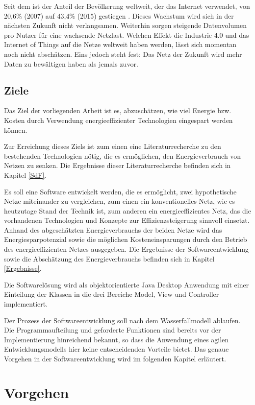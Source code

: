 \documentclass[12pt,titlepage]{article}
\begin{document}
Seit dem ist der Anteil der Bevölkerung weltweit, der das Internet verwendet, von 20,6\% (2007) auf 43,4\% (2015) gestiegen \cite{itu}. Dieses Wachstum wird sich in der nächsten Zukunft nicht verlangsamen. Weiterhin sorgen steigende Datenvolumen pro Nutzer für eine wachsende Netzlast. Welchen Effekt die Industrie 4.0 und das Internet of Things auf die Netze weltweit haben werden, lässt sich momentan  noch nicht abschätzen. Eins jedoch steht fest: Das Netz der Zukunft wird mehr Daten zu bewältigen haben als jemals zuvor.

\subsection{Ziele}
Das Ziel der vorliegenden Arbeit ist es, abzuschätzen, wie viel Energie bzw. Kosten  durch Verwendung energieeffizienter Technologien eingespart werden können.

Zur Erreichung dieses Ziels ist zum einen eine Literaturrecherche zu den bestehenden Technologien nötig, die es ermöglichen, den Energieverbrauch von Netzen zu senken. Die Ergebnisse dieser Literaturrecherche befinden sich in Kapitel \ref{SdF}.

Es soll eine Software entwickelt werden, die es ermöglicht, zwei hypothetische Netze miteinander zu vergleichen, zum einen ein konventionelles Netz, wie es heutzutage Stand der Technik ist, zum anderen ein energieeffizientes Netz, das die vorhandenen Technologien und Konzepte zur Effizienzsteigerung sinnvoll einsetzt. Anhand des abgeschätzten Energieverbrauchs der beiden Netze wird das Energiesparpotenzial sowie die möglichen Kosteneinsparungen durch den Betrieb des energieeffizienten Netzes ausgegeben. Die Ergebnisse der Softwareentwicklung sowie die Abschätzung des Energieverbrauchs befinden sich in Kapitel \ref{Ergebnisse}.

Die Softwarelösung wird als objektorientierte Java Desktop Anwendung mit einer Einteilung der Klassen in die drei Bereiche Model, View und Controller implementiert.

Der Prozess der Softwareentwicklung soll nach dem Wasserfallmodell ablaufen. Die Programmaufteilung und geforderte Funktionen sind bereits vor der Implementierung hinreichend bekannt, so dass die Anwendung eines agilen Entwicklungsmodells hier keine entscheidenden Vorteile bietet. Das genaue Vorgehen in der Softwareentwicklung wird im folgenden Kapitel erläutert.

\section{Vorgehen}
\end{document}
